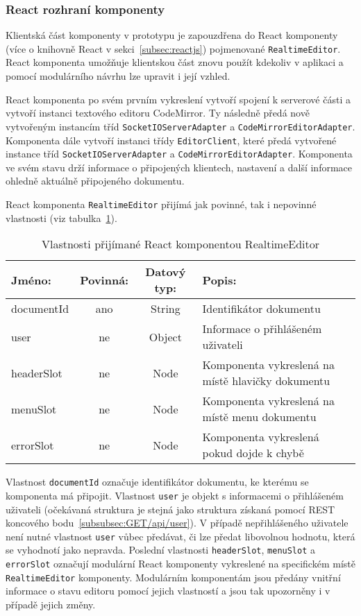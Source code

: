 
\subsubsection{React rozhraní komponenty}

Klientská část komponenty v prototypu je zapouzdřena do React komponenty (více o knihovně React v sekci~\ref{subsec:reactjs}) pojmenované \texttt{RealtimeEditor}.
React komponenta umožňuje klientskou část znovu použít kdekoliv v aplikaci a pomocí modulárního návrhu lze upravit i její vzhled.

React komponenta po svém prvním vykreslení vytvoří spojení k serverové části a vytvoří instanci textového editoru CodeMirror.
Ty následně předá nově vytvořeným instancím tříd \texttt{SocketIOServerAdapter} a \texttt{CodeMirrorEditorAdapter}.
Komponenta dále vytvoří instanci třídy \texttt{EditorClient}, které předá vytvořené instance tříd \texttt{SocketIOServerAdapter} a \texttt{CodeMirrorEditorAdapter}.
Komponenta ve svém stavu drží informace o připojených klientech, nastavení a další informace ohledně aktuálně připojeného dokumentu.

React komponenta \texttt{RealtimeEditor} přijímá jak povinné, tak i nepovinné vlastnosti (viz tabulka~\ref{tab:reactKomponenta}).

\begin{table}[ht!]\centering
\caption{Vlastnosti přijímané React komponentou RealtimeEditor}\label{tab:reactKomponenta}

\begin{tabular}{l c c p{5.5cm}}
    Jméno: & Povinná: & Datový typ: & Popis:\\ \hline
    documentId & ano & String & Identifikátor dokumentu\\ \hline
    user & ne & Object & Informace o přihlášeném uživateli\\ \hline
    headerSlot & ne & Node & Komponenta vykreslená na místě hlavičky dokumentu \\ \hline
    menuSlot & ne & Node & Komponenta vykreslená na místě menu dokumentu \\ \hline
    errorSlot & ne & Node & Komponenta vykreslená pokud dojde k chybě \\
\end{tabular}
\end{table}

Vlastnost \texttt{documentId} označuje identifikátor dokumentu, ke kterému se komponenta má připojit.
Vlastnost \texttt{user} je objekt s informacemi o přihlášeném uživateli (očekávaná struktura je stejná jako struktura získaná pomocí \gls{REST} koncového bodu~\ref{subsubsec:GET/api/user}).
V případě nepřihlášeného uživatele není nutné vlastnost \texttt{user} vůbec předávat, či lze předat libovolnou hodnotu, která se vyhodnotí jako nepravda.
Poslední vlastnosti \texttt{headerSlot}, \texttt{menuSlot} a \texttt{errorSlot} označují modulární React komponenty vykreslené na specifickém místě \texttt{RealtimeEditor} komponenty.
Modulárním komponentám jsou předány vnitřní informace o stavu editoru pomocí jejich vlastností a jsou tak upozorněny i v případě jejich změny.

